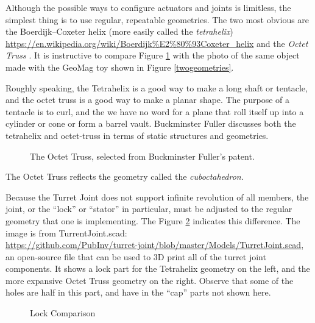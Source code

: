 \documentclass[11pt]{article}
\begin{document}
Although the possible ways to configure actuators and joints is limitless, the simplest thing is to
use regular, repeatable geometries. The two most obvious are the Boerdijk–Coxeter helix
(more easily called the \textit{tetrahelix})
\url{https://en.wikipedia.org/wiki/Boerdijk%E2%80%93Coxeter_helix}
  and the \emph{Octet Truss}
  \cite{richard1961synergetic}.
  It is instructive to compare Figure \ref{octet-truss-patent} with the photo of the same object
  made with the GeoMag toy shown in Figure \ref{twogeometries}.
    
Roughly speaking, the Tetrahelix is a good way to make a long shaft or tentacle, and the octet truss
is a good way to make a planar shape. The purpose of a tentacle is to curl, and the we have no word for
a plane that roll itself up into a cylinder or cone or form a barrel vault. Buckminster Fuller discusses
both the tetrahelix and octet-truss \cite{fuller1982synergetics} in terms of static structures and geometries.

\begin{figure}[!ht]
  \centering
    \caption[The Octet Truss]{The Octet Truss, selected from Buckminster Fuller's patent.}
      \label{octet-truss-patent}
\end{figure}

The Octet Truss reflects the geometry called the \emph{cuboctahedron}.

Because the Turret Joint does not support infinite revolution of all members, the joint, or the ``lock'' or ``stator'' in particular,
must be adjusted to the regular geometry that one is implementing.  The Figure \ref{lockcomparison} indicates this difference.
The image is from TurrentJoint.scad:\\
\href{https://github.com/PubInv/turret-joint/blob/master/Models/TurretJoint.scad}{https://github.com/PubInv/turret-joint/blob/master/Models/TurretJoint.scad}, an
open-source file that can be used to 3D print all of the turret joint components.
It shows a lock part for the Tetrahelix geometry
on the left, and the more expansive Octet Truss geometry on the right. Observe that some of the holes are half in this part,
and have in the ``cap'' parts not shown here.

\begin{figure}[!ht]
  \centering
    \caption[Lock Comparison]{Lock Comparison}
      \label{lockcomparison}
\end{figure}
\end{document}
